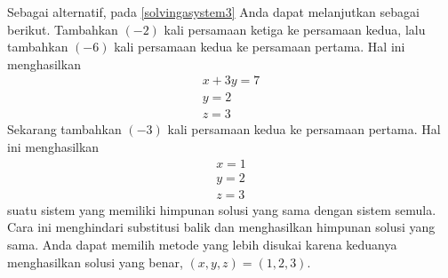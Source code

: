 \begin{solution}
Sebagai alternatif, pada \ref{solvingasystem3} Anda dapat melanjutkan sebagai berikut. Tambahkan $\left(
-2\right) $ kali persamaan ketiga ke persamaan kedua, lalu tambahkan $\left(
-6\right) $ kali persamaan kedua ke persamaan pertama. Hal ini menghasilkan
\begin{equation*}
\allowbreak
\begin{array}{c}
x+3y=7 \\
y=2 \\
z=3
\end{array}
\end{equation*}
Sekarang tambahkan $\left( -3\right) $ kali persamaan kedua ke persamaan pertama. Hal ini menghasilkan
\begin{equation*}
\allowbreak
\begin{array}{c}
x=1 \\
y=2 \\
z=3
\end{array}
\end{equation*}
suatu sistem yang memiliki himpunan solusi yang sama dengan sistem semula. Cara ini
menghindari substitusi balik dan menghasilkan himpunan solusi yang sama. Anda dapat memilih metode yang lebih disukai karena keduanya menghasilkan solusi yang benar,
$\left( x,y,z \right) = \left(1,2,3\right)$.
\end{solution}
